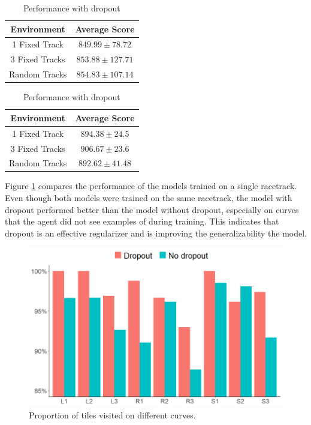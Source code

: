 \documentclass{article}
\begin{document}
\begin{table}[h!]
\begin{center}
\begin{minipage}[t]{.4\textwidth}
  \begin{tabular}{c|c}
    \textbf{Environment} & \textbf{Average Score}\\ \hline
    1 Fixed Track & $849.99\pm78.72$ \\
    3 Fixed Tracks & $853.88\pm127.71$ \\
    Random Tracks & $854.83\pm107.14$ \\
  \end{tabular}
  \caption{Performance without dropout}
  \label{tab:base_scores}
\end{minipage}
\hspace{1cm}
\begin{minipage}[t]{.4\textwidth}
  \begin{tabular}{c|c}
    \textbf{Environment} & \textbf{Average Score}\\
    \hline
    1 Fixed Track & $894.38\pm24.5$ \\
    3 Fixed Tracks &  $906.67\pm23.6$ \\
    Random Tracks & $892.62\pm41.48$ \\
  \end{tabular}
  \caption{Performance with dropout}
  \label{tab:drop_scores}
\end{minipage}
\end{center}
\vspace{-5mm}
\end{table}

Figure \ref{fig:curves_comparison} compares the performance of the
models trained on a single racetrack. Even though both models were
trained on the same racetrack, the model with dropout performed better
than the model without dropout, especially on curves that the agent
did not see examples of during training. This indicates that 
dropout is an effective regularizer and is improving the
generalizability the model. 

\begin{figure}[!h]
\captionsetup{justification=centering}
\centering
\includegraphics[width=.55\linewidth]{Graphics/curve_plot_v2.png}
\caption{Proportion of tiles visited on different curves. }
\label{fig:curves_comparison}
\vspace{-4mm}
\end{figure}
\end{document}
